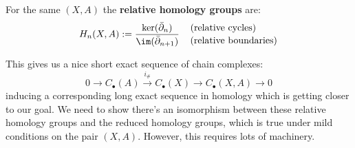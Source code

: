 \documentclass[a4paper]{article}
\begin{document}
\begin{definition}
    For the same $(X,A)$ the \textbf{relative homology groups} are: \[
    H_n(X,A) := \frac{\ker(\bar{\partial}_n)}{\im(\bar{\partial}_{n+1})} \quad
    \genfrac{}{}{0pt}{}{\text{(relative cycles)\hspace{22pt}}}{\text{(relative boundaries)}}
    \]
\end{definition}

\begin{exercise}
\end{exercise}
This gives us a nice short exact sequence of chain complexes: \[
    0\rightarrow C_\bullet(A)\xrightarrow{i_\#} C_\bullet(X) \rightarrow C_\bullet(X,A)\rightarrow 0
\]
inducing a corresponding long exact sequence in homology which is getting closer to our goal. We need to show there's an isomorphism between these relative homology groups and the reduced homology groups, which is true under mild conditions on the pair $(X,A)$. However, this requires lots of machinery.
\end{document}
